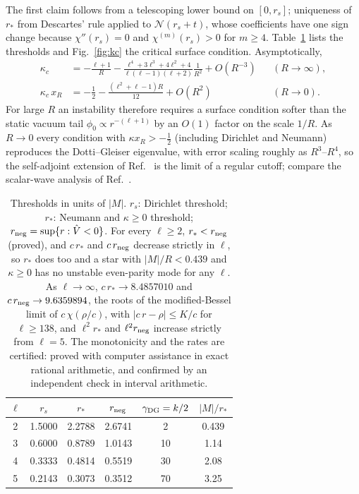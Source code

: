 \documentclass[11pt]{article}
\theoremstyle{remark}
\newcommand{\Vhat}{\hat{V}}
\begin{document}
The first claim follows from a telescoping lower bound on $[0,r_s]$; uniqueness of $r_*$ from Descartes' rule applied to
$\mathcal N(r_s+t)$, whose coefficients have one sign change because $\chi''(r_s)=0$ and $\chi^{(m)}(r_s)>0$ for
$m\ge4$. Table~\ref{tab:thr} lists the thresholds and Fig.~\ref{fig:kc} the critical surface condition. Asymptotically,
\begin{align}
\kappa_c&=-\frac{\ell+1}{R}-\frac{\ell^4+3\ell^3+4\ell^2+4}{\ell(\ell-1)(\ell+2)}\frac{1}{R^2}+O(R^{-3})
&&(R\to\infty),\\
\kappa_c\,x_R&=-\frac12-\frac{(\ell^2+\ell-1)R}{12}+O(R^2)&&(R\to0).
\end{align}
For large $R$ an instability therefore requires a surface condition softer than the static vacuum tail
$\phi_0\propto r^{-(\ell+1)}$ by an $O(1)$ factor on the scale $1/R$. As $R\to0$ every condition with
$\kappa x_R>-\tfrac12$ (including Dirichlet and Neumann) reproduces the Dotti--Gleiser eigenvalue, with error scaling
roughly as $R^3$--$R^4$, so the self-adjoint extension of Ref.~\cite{DG2009} is the limit of a regular cutoff; compare
the scalar-wave analysis of Ref.~\cite{Giveon2004}.

\begin{table}[t]
\centering
\begin{tabular}{cccccc}
\toprule
$\ell$ & $r_s$ & $r_*$ & $r_{\rm neg}$ & $\gamma_{\rm DG}=k/2$ & $|M|/r_*$\\
\midrule
2 & 1.5000 & 2.2788 & 2.6741 & 2 & 0.439\\
3 & 0.6000 & 0.8789 & 1.0143 & 10 & 1.14\\
4 & 0.3333 & 0.4814 & 0.5519 & 30 & 2.08\\
5 & 0.2143 & 0.3073 & 0.3512 & 70 & 3.25\\
\bottomrule
\end{tabular}
\caption{Thresholds in units of $|M|$. $r_s$: Dirichlet threshold; $r_*$: Neumann and $\kappa\ge0$ threshold;
$r_{\rm neg}=\sup\{r:\Vhat<0\}$. For every $\ell\ge2$, $r_*<r_{\rm neg}$ (proved), and $c\,r_*$ and $c\,r_{\rm neg}$ decrease
strictly in $\ell$, so $r_*$ does too and a star with $|M|/R<0.439$ and $\kappa\ge0$ has no unstable even-parity mode for
any $\ell$. As $\ell\to\infty$, $c\,r_*\to8.4857010$ and $c\,r_{\rm neg}\to9.6359894$, the roots of the modified-Bessel
limit of $c\,\chi(\rho/c)$, with $|c\,r-\rho|\le K/c$ for $\ell\ge138$, and $\ell^2r_*$ and $\ell^2r_{\rm neg}$ increase strictly
from $\ell=5$. The monotonicity and the rates are certified: proved with computer assistance in exact rational
arithmetic, and confirmed by an independent check in interval arithmetic.}
\label{tab:thr}
\end{table}
\end{document}
